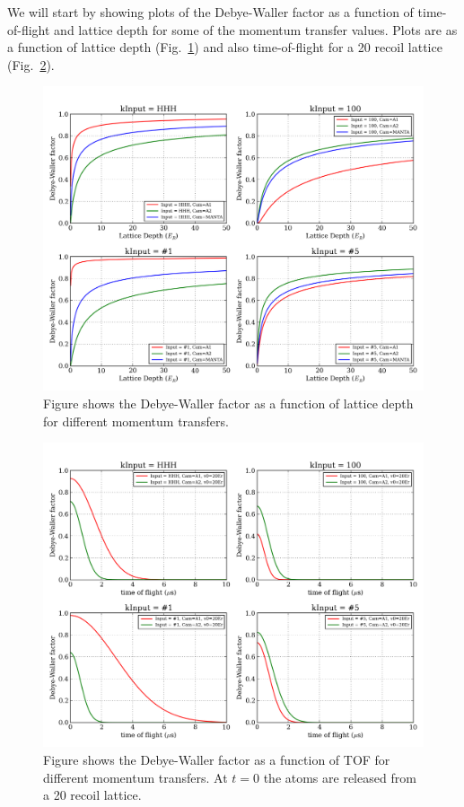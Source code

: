 \documentclass[11pt,letter]{article}
\begin{document}
We will start by showing plots of the Debye-Waller factor as a function of time-of-flight and lattice depth for some of the momentum transfer values.  Plots are as a function of lattice depth (Fig.~\ref{fig:debye-waller_HHH_v0}) and also time-of-flight for a 20 recoil lattice (Fig.~\ref{fig:debye-waller_HHH_tof}).
\begin{figure}
\centering \includegraphics[width=\textwidth]{../debye-waller_HHH/DWv0_plot.png}
\caption[Debye-Waller vs. Lattice depth]{\small Figure shows the Debye-Waller factor as a function of lattice depth for different momentum transfers.}
\label{fig:debye-waller_HHH_v0}
\end{figure}
\begin{figure}
\centering \includegraphics[width=\textwidth]{../debye-waller_HHH/DWtof_plot_20Er.png}
\caption[Debye-Waller vs. TOF]{\small Figure shows the Debye-Waller factor as a function of TOF for different momentum transfers. At $t=0$ the atoms are released from a 20 recoil lattice.}
\label{fig:debye-waller_HHH_tof}
\end{figure}
\end{document}
